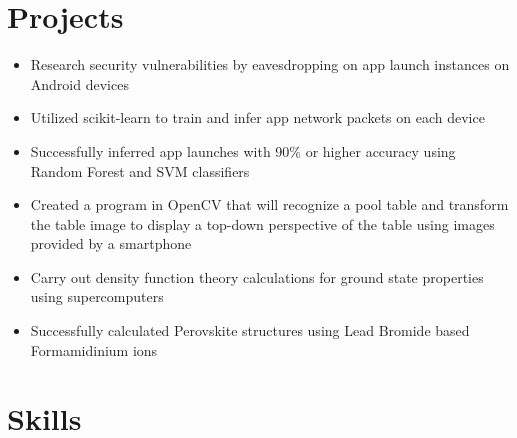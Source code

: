 \documentclass{Custom_CV}
\begin{document}
\section{Projects}
\begin{itemize}[rightmargin=\dimexpr\linewidth-15cm-\leftmargin\relax,noitemsep]
\item Research security vulnerabilities by eavesdropping on app launch instances on Android devices
\item Utilized scikit-learn to train and infer app network packets on each device
\item Successfully inferred app launches with 90\% or higher accuracy using Random Forest and SVM classifiers
\end{itemize}

\begin{itemize}[rightmargin=\dimexpr\linewidth-15cm-\leftmargin\relax,noitemsep]
\item Created a program in OpenCV that will recognize a pool table and transform the table image to display a top-down perspective of the table using images provided by a smartphone
\end{itemize}

\begin{itemize}[rightmargin=\dimexpr\linewidth-15cm-\leftmargin\relax,noitemsep]
\item Carry out density function theory calculations for ground state properties using supercomputers
\item Successfully calculated Perovskite structures using Lead Bromide based Formamidinium ions
\end{itemize}
\section{Skills}
\end{document}

